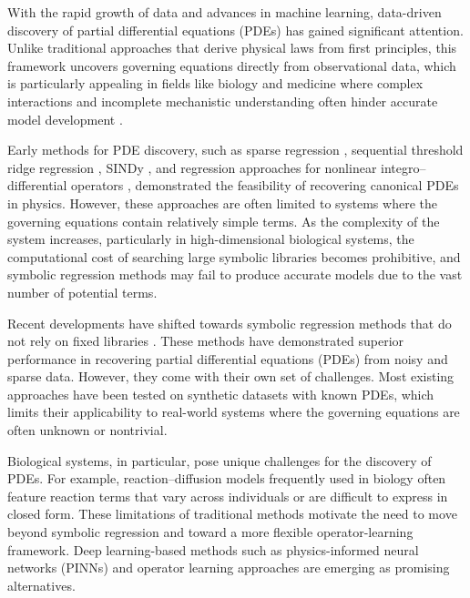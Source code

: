 \documentclass[preprint,12pt]{elsarticle}
\theoremstyle{plain}
\numberwithin{figure}{section}
\numberwithin{table}{section}
\newcommand{\jddd}[1]{{\color{black}#1}}
\begin{document}
With the rapid growth of data and advances in machine learning, data-driven discovery of partial differential equations (PDEs) has gained significant attention. Unlike traditional approaches that derive physical laws from first principles, this framework uncovers governing equations directly from observational data, which is particularly appealing in fields like biology and medicine where complex interactions and incomplete mechanistic understanding often hinder accurate model development \cite{ge2024data}.

Early methods for PDE discovery, such as sparse regression \cite{tibshirani1996regression}, sequential threshold ridge regression \cite{rudy2017data}, SINDy \cite{brunton2016discovering}, \jddd{and regression approaches for nonlinear integro–differential operators \cite{patel2018nonlinear}}, demonstrated the feasibility of recovering canonical PDEs in physics. However, these approaches are often limited to systems where the governing equations contain relatively simple terms. As the complexity of the system increases, particularly in high-dimensional biological systems, the computational cost of searching large symbolic libraries becomes prohibitive, and symbolic regression methods may fail to produce accurate models due to the vast number of potential terms.


Recent developments have shifted towards symbolic regression methods that do not rely on fixed libraries \cite{kim2020integration,lu2022discovering,zhang2023deep,vaddireddy2019equation,zhang2025coefficient}. These methods have demonstrated superior performance in recovering partial differential equations (PDEs) from noisy and sparse data. However, they come with their own set of challenges. Most existing approaches have been tested on synthetic datasets with known PDEs, which limits their applicability to real-world systems where the governing equations are often unknown or nontrivial.

Biological systems, in particular, pose unique challenges for the discovery of PDEs. For example, reaction--diffusion models frequently used in biology often feature reaction terms that vary across individuals or are difficult to express in closed form. These limitations of traditional methods motivate the need to move beyond symbolic regression and toward a more flexible operator-learning framework. Deep learning-based methods such as physics-informed neural networks (PINNs) \cite{raissi2017physics,raissi2019physics,siegel2023greedy} and operator learning approaches \cite{hao2024newton,yu2024nonlocal,zhang2024modno,liu2024deep} are emerging as promising alternatives.
\end{document}
